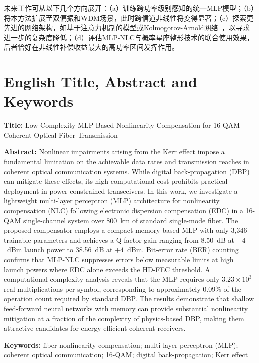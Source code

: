 \documentclass[conference]{IEEEtran}
\begin{document}
未来工作可从以下几个方向展开：（a）训练跨功率级别感知的统一MLP模型；（b）将本方法扩展至双偏振和WDM场景，此时跨信道非线性将变得显著；（c）探索更先进的网络架构，如基于注意力机制的模型或Kolmogorov-Arnold网络~\cite{gdpkan2025}，以寻求进一步的复杂度降低；（d）评估MLP-NLC与概率星座整形技术的联合使用效果，后者恰好在非线性补偿收益最大的高功率区间发挥作用。

\section*{English Title, Abstract and Keywords}

\noindent\textbf{Title:} Low-Complexity MLP-Based Nonlinearity Compensation for 16-QAM Coherent Optical Fiber Transmission

\vspace{2mm}
\noindent\textbf{Abstract:} Nonlinear impairments arising from the Kerr effect impose a fundamental limitation on the achievable data rates and transmission reaches in coherent optical communication systems. While digital back-propagation (DBP) can mitigate these effects, its high computational cost prohibits practical deployment in power-constrained transceivers. In this work, we investigate a lightweight multi-layer perceptron (MLP) architecture for nonlinearity compensation (NLC) following electronic dispersion compensation (EDC) in a 16-QAM single-channel system over 800~km of standard single-mode fiber. The proposed compensator employs a compact memory-based MLP with only 3,346 trainable parameters and achieves a Q-factor gain ranging from 8.50~dB at $-4$~dBm launch power to 38.56~dB at $+4$~dBm. Bit-error rate (BER) counting confirms that MLP-NLC suppresses errors below measurable limits at high launch powers where EDC alone exceeds the HD-FEC threshold. A computational complexity analysis reveals that the MLP requires only $3.23 \times 10^3$ real multiplications per symbol, corresponding to approximately 0.09\% of the operation count required by standard DBP. The results demonstrate that shallow feed-forward neural networks with memory can provide substantial nonlinearity mitigation at a fraction of the complexity of physics-based DBP, making them attractive candidates for energy-efficient coherent receivers.

\vspace{2mm}
\noindent\textbf{Keywords:} fiber nonlinearity compensation; multi-layer perceptron (MLP); coherent optical communication; 16-QAM; digital back-propagation; Kerr effect
\end{document}
